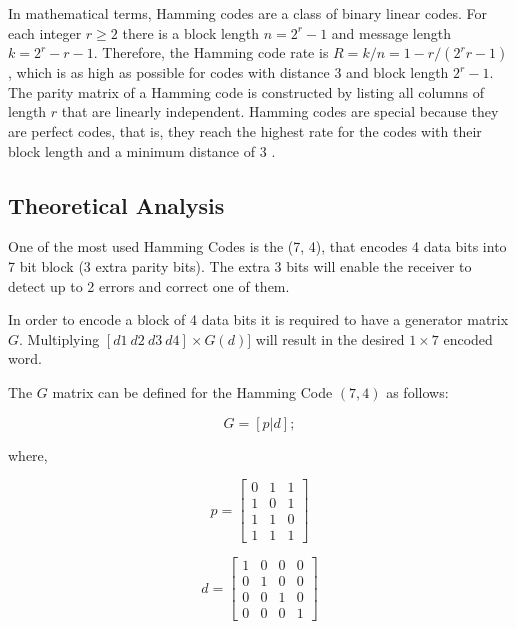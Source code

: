 \begin{refsection}
In mathematical terms, Hamming codes are a class of binary linear codes. For each integer $r \geq 2$ there is a block length $n = 2^{r} -1$ and message length $k = 2^{r} - r - 1$. Therefore, the Hamming code rate is $R = k / n = 1 - r / (2^{r}r - 1)$, which is as high as possible for codes with distance $3$ and block length $2^{r} - 1$. The parity matrix of a Hamming code is constructed by listing all columns of length $r$ that are linearly independent. Hamming codes are special because they are perfect codes, that is, they reach the highest rate for the codes with their block length and a minimum distance of $3$ \cite{venkatesanguruswami2010}.

\subsection{Theoretical Analysis}

One of the most used Hamming Codes is the (7, 4), that encodes 4 data bits into 7 bit block (3 extra parity bits). The extra 3 bits will enable the receiver to detect up to 2 errors and correct one of them.

In order to encode a block of 4 data bits it is required to have a generator matrix $G$. Multiplying $[d1 ~ d2 ~ d3 ~ d4] \times G(d)]$ will result in the desired $1 \times 7$ encoded word.

The $G$ matrix can be defined for the Hamming Code $(7, 4)$ as follows:

\begin{equation}
G = [p | d];
\end{equation}

where,

\begin{equation}
	p = \begin{bmatrix}
	0 & 1 & 1 \\ 
	1 & 0 & 1 \\ 
	1 & 1 & 0 \\ 
	1 & 1 & 1 
	\end{bmatrix}
\end{equation}

\begin{equation}
	d = \begin{bmatrix}
	1 & 0 & 0 & 0 \\ 
	0 & 1 & 0 & 0 \\ 
	0 & 0 & 1 & 0 \\ 
	0 & 0 & 0 & 1
	\end{bmatrix}
\end{equation}


\end{refsection}
